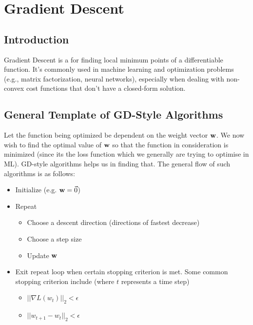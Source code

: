 \chapter{Gradient Descent}

\section{Introduction}
Gradient Descent is a  for finding local minimum points of a differentiable function. It's commonly used in machine learning and optimization problems (e.g., matrix factorization, neural networks), especially when dealing with non-convex cost functions that don't have a closed-form solution.
\section{General Template of GD-Style Algorithms}
Let the function being optimized be dependent on the weight vector $\textbf{w}$. We now wish to find the optimal value of $\textbf{w}$ so that the function in consideration is minimized (since its the loss function which we generally are trying to optimise in ML). GD-style algorithms helps us in finding that. The general flow of such algorithms is as follows:
\begin{itemize}
  \item Initialize {} (e.g. ${\textbf{w}} = \Vec{0}$)
  \item Repeat
        \begin{itemize}
          \item Choose a descent direction (directions of fastest decrease)
          \item Choose a step size
          \item Update ${\textbf{w}}$
        \end{itemize}
  \item Exit repeat loop when certain stopping criterion is met. Some common stopping criterion include  (where $t$ represents a time step)
        \begin{itemize}
          \item $|| \nabla L(w_{t}) ||_{2} < \epsilon$
          \item $|| {w_{t+1} - w_{t}} ||_{2} < \epsilon$
        \end{itemize}
\end{itemize}
